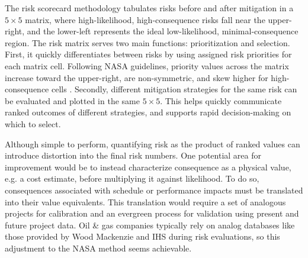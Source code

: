 The risk scorecard methodology tabulates risks before and after mitigation in a \({5\times5}\) matrix, where high-likelihood, high-consequence risks fall near the upper-right, and the lower-left represents the ideal low-likelihood, minimal-consequence region. The risk matrix serves two main functions: prioritization and selection. First, it quickly differentiates between risks by using assigned risk priorities for each matrix cell. Following NASA guidelines, priority values across the matrix increase toward the upper-right, are non-symmetric, and skew higher for high-consequence cells \citep{nasa_s3001_2017}. Secondly, different mitigation strategies for the same risk can be evaluated and plotted in the same \({5\times5}\). This helps quickly communicate ranked outcomes of different strategies, and supports rapid decision-making on which to select.

Although simple to perform, quantifying risk as the product of ranked values can introduce distortion into the final risk numbers. One potential area for improvement would be to instead characterize consequence as a physical value, e.g. a cost estimate, before multiplying it against likelihood. To do so, consequences associated with schedule or performance impacts must be translated into their value equivalents. This translation would require a set of analogous projects for calibration and an evergreen process for validation using present and future project data. Oil \& gas companies typically rely on analog databases like those provided by Wood Mackenzie \citep{wood_mackenzie_energy_2019} and IHS \citep{ihs_ihs_2021} during risk evaluations, so this adjustment to the NASA method seems achievable.


